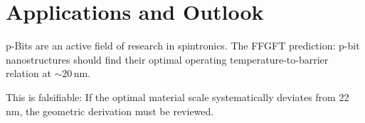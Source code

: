 \section{Applications and Outlook}

p-Bits are an active field of research in spintronics.
The FFGFT prediction: p-bit nanostructures should find their
optimal operating temperature-to-barrier relation at ${\sim}20\,\text{nm}$. 

This is falsifiable: If the optimal material scale systematically deviates from
22\,nm, the geometric derivation must be reviewed.